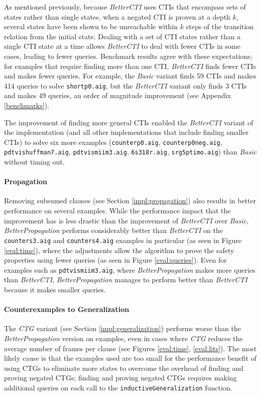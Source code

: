\documentclass[12pt,a4paper,twoside,openright]{report}
\begin{document}
{{{As mentioned previously, because \emph{BetterCTI} uses
CTIs that encompass sets of states rather than single states, when a negated CTI is proven at a depth
$k$, several states have been shown to be unreachable within $k$ steps of the transition relation
from the initial state. Dealing with a set of CTI states rather than a single CTI state
at a time allows \emph{BetterCTI} to deal with fewer CTIs in some cases,
leading to fewer queries.
Benchmark results
agree with these expectations; for examples that require finding more than one CTI, \emph{BetterCTI}
finds fewer CTIs and makes fewer queries.
For example, the \emph{Basic} variant finds 59 CTIs and makes 414 queries to solve
\verb,shortp0.aig,, but the \emph{BetterCTI} variant only finds 3 CTIs and makes 49 queries, an order of magnitude improvement (see Appendix \ref{benchmarks}). 

The improvement of finding more general CTIs enabled the \emph{BetterCTI} variant of the implementation
(and all other implementations that include finding smaller CTIs) to
solve six more examples (\verb,counterp0.aig,, \verb,counterp0neg.aig,, \verb,pdtvishuffman7.aig,, 
\verb,pdtvismiim3.aig,, \verb,6s318r.aig,, \verb,srg5ptimo.aig,) than \emph{Basic} without
timing out.}

\paragraph{Propagation}{
Removing subsumed clauses (see Section \ref{impl:propagation}) also results in better performance on several
examples. While the performance impact that the improvement has is less drastic than the improvement of
\emph{BetterCTI} over \emph{Basic}, \emph{BetterPropagation} performs
considerably better
than \emph{BetterCTI} on the \verb,counters3.aig, and \verb,counters4.aig, examples in
particular (as seen in Figure \ref{eval:time}), where the adjustments allow the algorithm to prove the safety properties using fewer
queries (as seen in Figure \ref{eval:queries}). Even for examples such as \verb,pdtvismiim3.aig,, where \emph{BetterPropagation} makes more
queries than \emph{BetterCTI}, \emph{BetterPropagation} manages to perform better than \emph{BetterCTI}
because it makes smaller queries.}

\paragraph{Counterexamples to Generalization}{
The \emph{CTG} variant (see Section \ref{impl:generalization})
performs worse than the \emph{BetterPropagation} version
on examples, even in cases where \emph{CTG} reduces the average number of frames per clause (see Figures \ref{eval:time}, \ref{eval:lits}).
The most likely cause is that the examples used are too small for the performance benefit of
using CTGs to eliminate more states
to overcome the overhead of finding and proving negated CTGs;
finding and proving negated CTGs requires
making additional queries on each call to the \verb,inductiveGeneralization, function.

}}}
\end{document}
